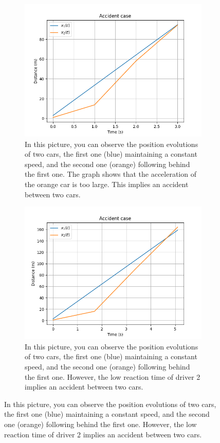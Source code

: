 \documentclass{article}
\begin{document}
	
	\begin{figure}[H]
		\centering
		\begin{subfigure}[b]{0.45\textwidth}
			\centering
			\includegraphics[width=\textwidth]{1W2_Acc1.png}
			\caption{In this picture, you can observe the position evolutions of two cars, the first one (blue) maintaining a constant speed, and the second one (orange) following behind the first one. The graph shows that the acceleration of the orange car is too large. This implies an accident between two cars.}
			\label{fig:sub1}
		\end{subfigure}
		\hfill
		\begin{subfigure}[b]{0.45\textwidth}
			\centering
			\includegraphics[width=\textwidth]{1W2_Acc2.png}
			\caption{In this picture, you can observe the position evolutions of two cars, the first one (blue) maintaining a constant speed, and the second one (orange) following behind the first one. However, the low reaction time of driver 2 implies an accident between two cars.}
			\label{fig:sub2}
		\end{subfigure}
		

\end{figure}
\end{document}
